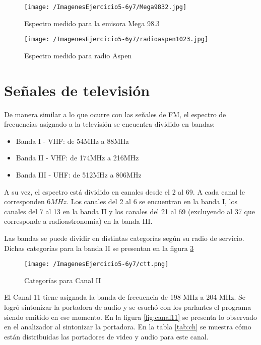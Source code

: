 \begin{figure}[H]
	\centering
	\texttt{[image: /ImagenesEjercicio5-6y7/Mega9832.jpg]}
\caption{Espectro medido para la emisora Mega 98.3}
	\label{fig:mega}
\end{figure}

\begin{figure}[H]
	\centering
	\texttt{[image: /ImagenesEjercicio5-6y7/radioaspen1023.jpg]}
\caption{Espectro medido para radio Aspen}
	\label{fig:aspen}
\end{figure}



\section{Señales de televisión}

De manera similar a lo que ocurre con las señales de FM, el espectro de frecuencias asignado a la televisión se encuentra dividido en bandas:
\begin{itemize}
    \item Banda I - VHF: de 54MHz a 88MHz 
    \item Banda II - VHF: de 174MHz a 216MHz 
    \item Banda III - UHF: de 512MHz a 806MHz
\end{itemize}

A su vez, el espectro está dividido en canales desde el 2 al 69. A cada canal le corresponden $6 MHz$. Los canales del 2 al 6 se encuentran en la banda I, los canales del 7 al 13 en la banda II y los canales del 21 al 69 (excluyendo al 37 que corresponde a radioastronomía) en la banda III.

Las bandas se puede dividir en distintas categorías según su radio de servicio. Dichas categorías para la banda II se presentan en la figura \ref{fig:ctt}

\begin{figure}[H]
	\centering
	\texttt{[image: /ImagenesEjercicio5-6y7/ctt.png]}
	\caption{Categorías para Canal II}	
	\label{fig:ctt}
\end{figure}

El Canal 11 tiene asignada la banda de frecuencia de 198 MHz a 204 MHz. Se logró sintonizar la portadora de audio y se esuchó con los parlantes el programa siendo emitido en ese momento. En la figura \ref{fig:canal11} se presenta lo observado en el analizador al sintonizar la portadora. En la tabla \ref{tab:ch} se muestra cómo están distribuidas las portadores de video y audio para este canal.

